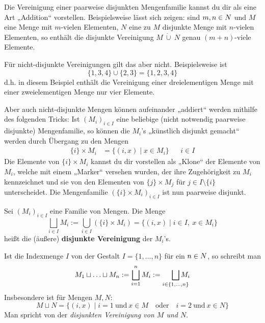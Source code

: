 \begin{bem}
    Die Vereinigung einer paarweise disjunkten Mengenfamilie kannst du dir als eine Art „Addition“ vorstellen. Beispielsweise lässt sich zeigen: sind $m,n\in \relax N$ und $M$ eine Menge mit $m$-vielen Elementen, $N$ eine zu $M$ disjunkte Menge mit $n$-vielen Elementen, so enthält die disjunkte Vereinigung $M\ \dot\cup\ N$ genau $(m+n)$-viele Elemente.

    Für nicht-disjunkte Vereinigungen gilt das aber nicht. Beispielsweise ist
        \[\{1,3,4\} \cup \{2,3\}= \{1,2,3,4\} \]
    d.h. in diesem Beispiel enthält die Vereinigung einer dreielementigen Menge mit einer zweielementigen Menge nur vier Elemente.

    Aber auch nicht-disjunkte Mengen können aufeinander „addiert“ werden mithilfe des folgenden Tricks: Ist $(M_i)_{i\in I}$ eine beliebige (nicht notwendig paarweise disjunkte) Mengenfamilie, so können die $M_i$'s „künstlich disjunkt gemacht“ werden durch Übergang zu den Mengen
    \begin{align*}
        \{i\}\times M_i &= \{(i,x) \mid x\in M_i\} && i\in I
    \end{align*}
    Die Elemente von $\{i\}\times M_i$ kannst du dir vorstellen als „Klone“ der Elemente von $M_i$, welche mit einem „Marker“ versehen wurden, der ihre Zugehörigkeit zu $M_i$ kennzeichnet und sie von den Elementen von $\{j\}\times M_j$ für $j\in I\setminus \{i\}$ unterscheidet. Die Mengenfamilie $(\{i\}\times M_i)_{i\in I}$ ist nun paarweise disjunkt.
\end{bem}


\begin{defin} \label{def:disjunktcup} 
    Sei $(M_i)_{i\in I}$ eine Familie von Mengen. Die Menge
        \[ \bigsqcup_{i\in I} M_i := \bigcup_{i\in I} (\{i\}\times M_i) = \{(i,x) \mid i\in I,\ x\in M_i \}\]
    heißt die (äußere) \textbf{disjunkte Vereinigung} der $M_i$'s.
    
    Ist die Indexmenge $I$ von der Gestalt $I=\{1,\dots , n\}$ für ein $n\in \relax N$, so schreibt man
        \[ M_1\sqcup\ldots\sqcup M_n := \bigsqcup_{i=1}^n M_i := \smashoperator[r]{\bigsqcup_{i\in \{1,\dots , n\}}} M_i \]
    Insbesondere ist für Mengen $M,N$:
        \[ M\sqcup N = \{ (i,x)\mid i=1\ \text{und}\ x\in M\quad\text{oder}\quad i=2\ \text{und}\ x\in N\} \]
    Man spricht von der \emph{disjunkten Vereinigung von $M$ und $N$}.
\end{defin}


